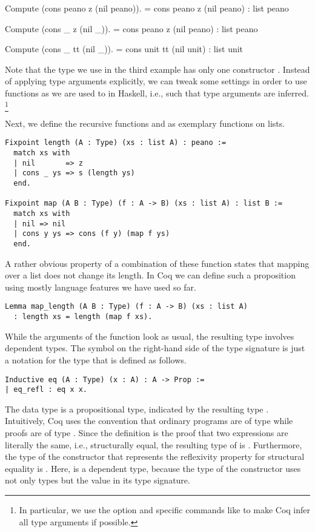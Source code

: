 \begin{crepl}
\coqrepl Compute (cons peano z (nil peano)).
    = cons peano z (nil peano)
    : list peano

\coqrepl Compute (cons _ z (nil _)).
    = cons peano z (nil peano)
    : list peano

\coqrepl Compute (cons _ tt (nil _)).
    = cons unit tt (nil unit)
    : list unit
\end{crepl}

Note that the type  we use in the third example has only one constructor .
Instead of applying type arguments explicitly, we can tweak some settings in order to use functions as we are used to in Haskell, i.e., such that type arguments are inferred. \footnote{In particular, we use the option  and specific commands like  to make Coq infer all type arguments if possible.}

Next, we define the recursive functions  and  as exemplary functions on lists.

\begin{verbatim}
Fixpoint length (A : Type) (xs : list A) : peano :=
  match xs with
  | nil       => z
  | cons _ ys => s (length ys)
  end.

Fixpoint map (A B : Type) (f : A -> B) (xs : list A) : list B :=
  match xs with
  | nil => nil
  | cons y ys => cons (f y) (map f ys)
  end.
\end{verbatim}

A rather obvious property of a combination of these function states that mapping over a list does not change its length.
In Coq we can define such a proposition using mostly language features we have used so far.

\begin{verbatim}
Lemma map_length (A B : Type) (f : A -> B) (xs : list A)
  : length xs = length (map f xs).
\end{verbatim}

While the arguments of the function  look as usual, the resulting type involves dependent types.
The symbol \cinl{=} on the right-hand side of the type signature is just a notation for the type  that is defined as follows.

\begin{verbatim}
Inductive eq (A : Type) (x : A) : A -> Prop :=
| eq_refl : eq x x.
\end{verbatim}

The data type  is a propositional type, indicated by the resulting type .
Intuitively, Coq uses the convention that ordinary programs are of type  while proofs are of type .
Since the definition  is the proof that two expressions are literally the same, i.e., structurally equal, the resulting type of  is .
Furthermore, the type of the constructor  that represents the reflexivity property for structural equality is .
Here,  is a dependent type, because the type of the constructor  uses not only types but the value  in its type signature.

